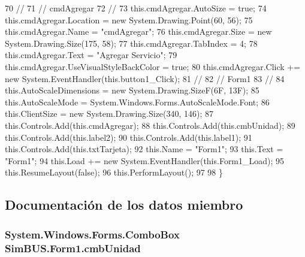 \begin{DoxyCode}
70             \textcolor{comment}{// }
71             \textcolor{comment}{// cmdAgregar}
72             \textcolor{comment}{// }
73             this.cmdAgregar.AutoSize = \textcolor{keyword}{true};
74             this.cmdAgregar.Location = \textcolor{keyword}{new} System.Drawing.Point(60, 56);
75             this.cmdAgregar.Name = \textcolor{stringliteral}{"cmdAgregar"};
76             this.cmdAgregar.Size = \textcolor{keyword}{new} System.Drawing.Size(175, 58);
77             this.cmdAgregar.TabIndex = 4;
78             this.cmdAgregar.Text = \textcolor{stringliteral}{"Agregar Servicio"};
79             this.cmdAgregar.UseVisualStyleBackColor = \textcolor{keyword}{true};
80             this.cmdAgregar.Click += \textcolor{keyword}{new} System.EventHandler(this.button1\_Click);
81             \textcolor{comment}{// }
82             \textcolor{comment}{// Form1}
83             \textcolor{comment}{// }
84             this.AutoScaleDimensions = \textcolor{keyword}{new} System.Drawing.SizeF(6F, 13F);
85             this.AutoScaleMode = System.Windows.Forms.AutoScaleMode.Font;
86             this.ClientSize = \textcolor{keyword}{new} System.Drawing.Size(340, 146);
87             this.Controls.Add(this.cmdAgregar);
88             this.Controls.Add(this.cmbUnidad);
89             this.Controls.Add(this.label2);
90             this.Controls.Add(this.label1);
91             this.Controls.Add(this.txtTarjeta);
92             this.Name = \textcolor{stringliteral}{"Form1"};
93             this.Text = \textcolor{stringliteral}{"Form1"};
94             this.Load += \textcolor{keyword}{new} System.EventHandler(this.Form1\_Load);
95             this.ResumeLayout(\textcolor{keyword}{false});
96             this.PerformLayout();
97 
98         \}
\end{DoxyCode}


\subsection{Documentación de los datos miembro}
\subsubsection[{cmb\-Unidad}]{\setlength{\rightskip}{0pt plus 5cm}System.\-Windows.\-Forms.\-Combo\-Box Sim\-B\-U\-S.\-Form1.\-cmb\-Unidad\hspace{0.3cm}{\ttfamily [private]}}\label{class_sim_b_u_s_1_1_form1_acabcf3299572cfc83d600e6ac476a5eb}


